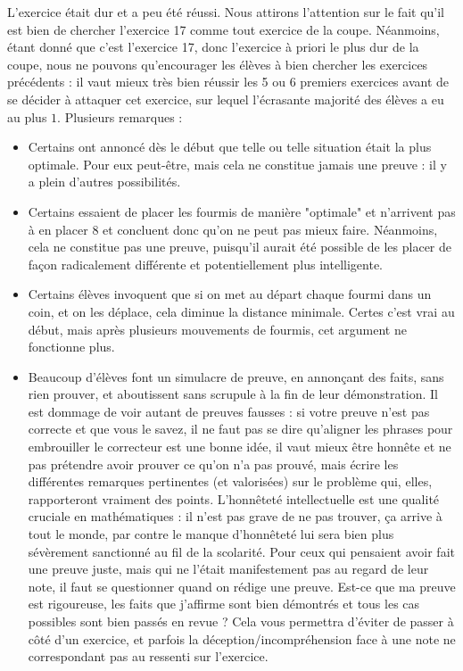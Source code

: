 L'exercice était dur et a peu été réussi. Nous attirons l'attention sur le fait qu'il est bien de chercher l'exercice 17 comme tout exercice de la coupe. Néanmoins, étant donné que c'est l'exercice 17, donc l'exercice à priori le plus dur de la coupe, nous ne pouvons qu'encourager les élèves à bien chercher les exercices précédents : il vaut mieux très bien réussir les 5 ou 6 premiers exercices avant de se décider à attaquer cet exercice, sur lequel l'écrasante majorité des élèves a eu au plus $1$. Plusieurs remarques : 
\begin{itemize}
\item Certains ont annoncé dès le début que telle ou telle situation était la plus optimale. Pour eux peut-être, mais cela ne constitue jamais une preuve : il y a plein d'autres possibilités.
\item Certains essaient de placer les fourmis de manière "optimale" et n'arrivent pas à en placer $8$ et concluent donc qu'on ne peut pas mieux faire. Néanmoins, cela ne constitue pas une preuve, puisqu'il aurait été possible de les placer de façon radicalement différente et potentiellement plus intelligente.
\item Certains élèves invoquent que si on met au départ chaque fourmi dans un coin, et on les déplace, cela diminue la distance minimale. Certes c'est vrai au début, mais après plusieurs mouvements de fourmis, cet argument ne fonctionne plus.
\item Beaucoup d'élèves font un simulacre de preuve, en annonçant des faits, sans rien prouver, et aboutissent sans scrupule à la fin de leur démonstration. Il est dommage de voir autant de preuves fausses : si votre preuve n'est pas correcte et que vous le savez, il ne faut pas se dire qu'aligner les phrases pour embrouiller le correcteur est une bonne idée, il vaut mieux être honnête et ne pas prétendre avoir prouver ce qu'on n'a pas prouvé, mais écrire les différentes remarques pertinentes (et valorisées) sur le problème qui, elles, rapporteront vraiment des points. L'honnêteté intellectuelle est une qualité cruciale en mathématiques : il n'est pas grave de ne pas trouver, ça arrive à tout le monde, par contre le manque d'honnêteté lui sera bien plus sévèrement sanctionné au fil de la scolarité. Pour ceux qui pensaient avoir fait une preuve juste, mais qui ne l'était manifestement pas au regard de leur note, il faut se questionner quand on rédige une preuve. Est-ce que ma preuve est rigoureuse, les faits que j'affirme sont bien démontrés et tous les cas possibles sont bien passés en revue ? Cela vous permettra d'éviter de passer à côté d'un exercice, et parfois la déception/incompréhension face à une note ne correspondant pas au ressenti sur l'exercice.
\end{itemize}